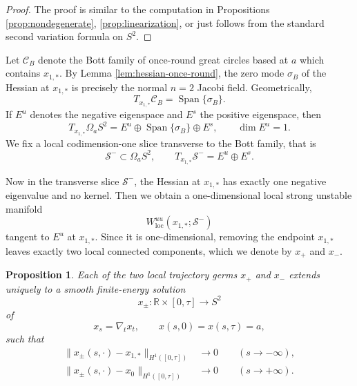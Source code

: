 \documentclass[11pt]{amsart}
\theoremstyle{plain}
\newtheorem{prop}[thm]{Proposition}
\theoremstyle{definition}
\newcommand{\R}{\mathbb{R}}
\begin{document}
\begin{proof} The proof is similar to the computation in Propositions \ref{prop:nondegenerate}, \ref{prop:linearization}, or just follows from the standard second variation formula on $S^2$. 
\end{proof}



Let $\mathcal{C}_B$ denote the Bott family of once-round great circles based at $a$
which contains $x_{1,*}$. By Lemma \ref{lem:hessian-once-round}, the zero mode $\sigma_B$ of the Hessian at
$x_{1,*}$ is precisely the normal $n=2$ Jacobi field. Geometrically, %
\[
T_{x_{1,*}}\mathcal{C}_B=\operatorname{Span}\{\sigma_B\}.
\]
If $E^u$ denotes the negative eigenspace and $E^s$ the positive eigenspace, then
\[
T_{x_{1,*}}\Omega_a S^2
=
E^u\oplus \operatorname{Span}\{\sigma_B\}\oplus E^s,
\qquad
\dim E^u=1.
\]
We fix a local codimension-one slice transverse to the Bott family, that is
\[
\mathcal S^-\subset \Omega_aS^2,\qquad
T_{x_{1,*}}\mathcal S^-=E^u\oplus E^s.
\]

Now in the transverse slice $\mathcal S^-$, the Hessian at $x_{1,*}$ has exactly one
negative eigenvalue and no kernel. Then we obtain
a one-dimensional local strong unstable manifold
\[
W^{uu}_{\mathrm{loc}}(x_{1,*};\mathcal S^-)
\]
tangent to $E^u$ at $x_{1,*}$. Since it is one-dimensional, removing the endpoint
$x_{1,*}$ leaves exactly two local connected components, which we denote by $x_+$ and $x_-$.



\begin{prop}\label{prop:S2-global-existence}
Each of the two local trajectory germs $x_+$ and $x_-$ extends uniquely to a smooth
finite-energy solution
\[
x_\pm:\R\times[0,\tau]\longrightarrow S^2
\]
of
\[
x_s=\nabla_t x_t,\qquad x(s,0)=x(s,\tau)=a,
\]
such that
\begin{align*}
\|x_\pm(s,\cdot)-x_{1,*}\|_{H^1([0,\tau])}&\longrightarrow 0
\qquad (s\to-\infty),\\
\|x_\pm(s,\cdot)-x_0\|_{H^1([0,\tau])}&\longrightarrow 0
\qquad (s\to+\infty).
\end{align*}
\end{prop}
\end{document}
